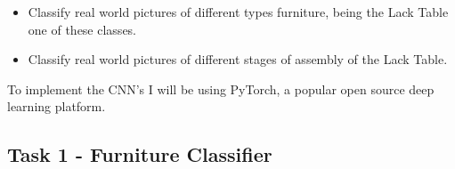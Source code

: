 \documentclass[10pt,a4paper]{article}
\begin{document}
\begin{itemize}
\item Classify real world pictures of different types furniture, being the Lack Table one of these classes.
\item Classify real world pictures of different stages of assembly of the Lack Table. 
\end{itemize}

To implement the CNN's I will be using PyTorch, a popular open source deep learning platform.

\subsection{Task 1 - Furniture Classifier}




\end{document}
